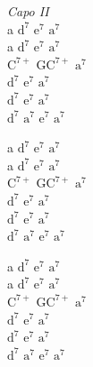 \begin{chord}
    \textit{Capo II}\\
    a $\mathrm{d^7}$ $\mathrm{e^7}$ $\mathrm{a^7}$\\
    a $\mathrm{d^7}$ $\mathrm{e^7}$ $\mathrm{a^7}$\\
    $\mathrm{C^{7+}}$ G$\mathrm{C^{7+}}$ $\mathrm{a^7}$\\
    $\mathrm{d^7}$ $\mathrm{e^7}$ $\mathrm{a^7}$\\
    $\mathrm{d^7}$ $\mathrm{e^7}$ $\mathrm{a^7}$\\
    $\mathrm{d^7}$ $\mathrm{a^7}$ $\mathrm{e^7}$ $\mathrm{a^7}$

    a $\mathrm{d^7}$ $\mathrm{e^7}$ $\mathrm{a^7}$\\
    a $\mathrm{d^7}$ $\mathrm{e^7}$ $\mathrm{a^7}$\\
    $\mathrm{C^{7+}}$ G$\mathrm{C^{7+}}$ $\mathrm{a^7}$\\
    $\mathrm{d^7}$ $\mathrm{e^7}$ $\mathrm{a^7}$\\
    $\mathrm{d^7}$ $\mathrm{e^7}$ $\mathrm{a^7}$\\
    $\mathrm{d^7}$ $\mathrm{a^7}$ $\mathrm{e^7}$ $\mathrm{a^7}$

    a $\mathrm{d^7}$ $\mathrm{e^7}$ $\mathrm{a^7}$\\
    a $\mathrm{d^7}$ $\mathrm{e^7}$ $\mathrm{a^7}$\\
    $\mathrm{C^{7+}}$ G$\mathrm{C^{7+}}$ $\mathrm{a^7}$\\
    $\mathrm{d^7}$ $\mathrm{e^7}$ $\mathrm{a^7}$\\
    $\mathrm{d^7}$ $\mathrm{e^7}$ $\mathrm{a^7}$\\
    $\mathrm{d^7}$ $\mathrm{a^7}$ $\mathrm{e^7}$ $\mathrm{a^7}$
\end{chord}
